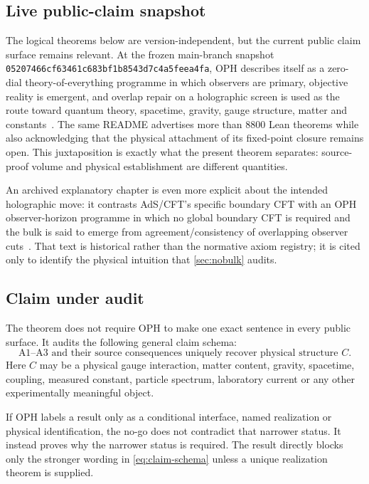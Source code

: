 \documentclass[10pt,a4paper]{article}
\theoremstyle{definition}
\theoremstyle{remark}
\begin{document}
\subsection{Live public-claim snapshot}

The logical theorems below are version-independent, but the current public
claim surface remains relevant.  At the frozen main-branch snapshot
\texttt{05207466cf63461c683bf1b8543d7c4a5feea4fa}, OPH describes itself as a
zero-dial theory-of-everything programme in which observers are primary,
objective reality is emergent, and overlap repair on a holographic screen is
used as the route toward quantum theory, spacetime, gravity, gauge structure,
matter and constants~\cite{OPHCurrentREADME}.  The same README advertises more
than 8800 Lean theorems while also acknowledging that the physical attachment
of its fixed-point closure remains open.  This juxtaposition is exactly what
the present theorem separates: source-proof volume and physical establishment
are different quantities.

An archived explanatory chapter is even more explicit about the intended
holographic move: it contrasts AdS/CFT's specific boundary CFT with an OPH
observer-horizon programme in which no global boundary CFT is required and the
bulk is said to emerge from agreement/consistency of overlapping observer
cuts~\cite{OPHArchivedHolography}.  That text is historical rather than the
normative axiom registry; it is cited only to identify the physical intuition
that \cref{sec:nobulk} audits.

\subsection{Claim under audit}

The theorem does not require OPH to make one exact sentence in every public
surface.  It audits the following general claim schema:
\begin{equation}
\label{eq:claim-schema}
\text{A1--A3 and their source consequences uniquely recover physical structure }C.
\end{equation}
Here \(C\) may be a physical gauge interaction, matter content, gravity,
spacetime, coupling, measured constant, particle spectrum, laboratory current
or any other experimentally meaningful object.

If OPH labels a result only as a conditional interface, named realization or
physical identification, the no-go does not contradict that narrower status.
It instead proves why the narrower status is required.  The result directly
blocks only the stronger wording in \cref{eq:claim-schema} unless a unique
realization theorem is supplied.
\end{document}
